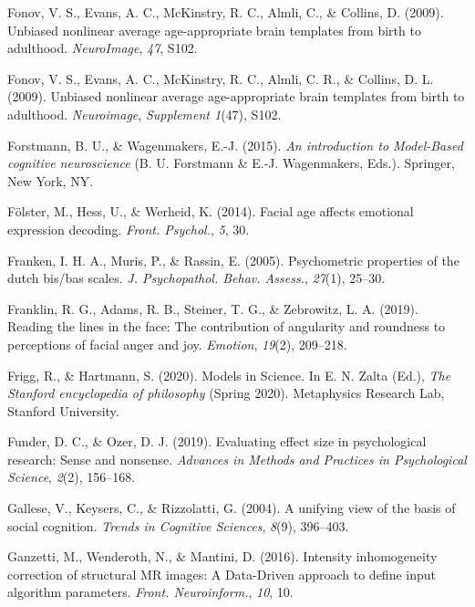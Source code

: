 \documentclass[11pt,american,]{memoir} %
\begin{document}
\leavevmode\hypertarget{ref-fonov2009unbiased}{}%
Fonov, V. S., Evans, A. C., McKinstry, R. C., Almli, C., \& Collins, D. (2009). Unbiased nonlinear average age-appropriate brain templates from birth to adulthood. \emph{NeuroImage}, \emph{47}, S102.

\leavevmode\hypertarget{ref-Fonov2009-sr}{}%
Fonov, V. S., Evans, A. C., McKinstry, R. C., Almli, C. R., \& Collins, D. L. (2009). Unbiased nonlinear average age-appropriate brain templates from birth to adulthood. \emph{Neuroimage}, \emph{Supplement 1}(47), S102.

\leavevmode\hypertarget{ref-Forstmann2015-rz}{}%
Forstmann, B. U., \& Wagenmakers, E.-J. (2015). \emph{An introduction to Model-Based cognitive neuroscience} (B. U. Forstmann \& E.-J. Wagenmakers, Eds.). Springer, New York, NY.

\leavevmode\hypertarget{ref-Folster2014-zy}{}%
Fölster, M., Hess, U., \& Werheid, K. (2014). Facial age affects emotional expression decoding. \emph{Front. Psychol.}, \emph{5}, 30.

\leavevmode\hypertarget{ref-Franken2005-jg}{}%
Franken, I. H. A., Muris, P., \& Rassin, E. (2005). Psychometric properties of the dutch bis/bas scales. \emph{J. Psychopathol. Behav. Assess.}, \emph{27}(1), 25--30.

\leavevmode\hypertarget{ref-Franklin2019-qo}{}%
Franklin, R. G., Adams, R. B., Steiner, T. G., \& Zebrowitz, L. A. (2019). Reading the lines in the face: The contribution of angularity and roundness to perceptions of facial anger and joy. \emph{Emotion}, \emph{19}(2), 209--218.

\leavevmode\hypertarget{ref-Frigg2020-hp}{}%
Frigg, R., \& Hartmann, S. (2020). Models in Science. In E. N. Zalta (Ed.), \emph{The Stanford encyclopedia of philosophy} (Spring 2020). Metaphysics Research Lab, Stanford University.

\leavevmode\hypertarget{ref-Funder2019-ow}{}%
Funder, D. C., \& Ozer, D. J. (2019). Evaluating effect size in psychological research: Sense and nonsense. \emph{Advances in Methods and Practices in Psychological Science}, \emph{2}(2), 156--168.

\leavevmode\hypertarget{ref-gallese2004unifying}{}%
Gallese, V., Keysers, C., \& Rizzolatti, G. (2004). A unifying view of the basis of social cognition. \emph{Trends in Cognitive Sciences}, \emph{8}(9), 396--403.

\leavevmode\hypertarget{ref-Ganzetti2016-yy}{}%
Ganzetti, M., Wenderoth, N., \& Mantini, D. (2016). Intensity inhomogeneity correction of structural MR images: A Data-Driven approach to define input algorithm parameters. \emph{Front. Neuroinform.}, \emph{10}, 10.
\end{document}

